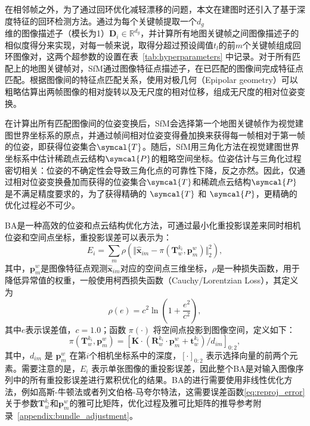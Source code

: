 在相邻帧之外，为了通过回环优化减轻漂移的问题，本文在建图时还引入了基于深度特征的回环检测方法。通过为每个关键帧提取一个$d_g$维的图像描述子（模长为1）$\symbf{D}_i \in \mathbb{R}^{d_g}$，并计算所有地图关键帧之间图像描述子的相似度得分来实现，对每一帧来说，取得分超过预设阈值$t_l$的前$m$个关键帧组成回环图像对，这两个超参数的设置在表~\ref{tab:hyperparameters} 中记录。对于所有匹配上的地图关键帧对，SfM通过图像特征点描述子，在已匹配的图像间完成特征点匹配。根据图像间的特征点匹配关系，使用对极几何（Epipolar geometry）\cite{wexler2003learning}可以粗略估算出两帧图像的相对旋转以及无尺度的相对位移，组成无尺度的相对位姿变换。

在计算出所有匹配图像间的位姿变换后，SfM会选择第一个地图关键帧作为视觉建图世界坐标系的原点，并通过帧间相对位姿变得叠加换来获得每一帧相对于第一帧的位姿，即获得位姿集合$\symcal{T}$。随后，SfM用三角化方法在视觉建图世界坐标系中估计稀疏点云结构$\symcal{P}$的粗略空间坐标。位姿估计与三角化过程密切相关：位姿的不确定性会导致三角化点的可靠性下降，反之亦然。因此，仅通过相对位姿变换叠加而获得的位姿集合$\symcal{T}$和稀疏点云结构$\symcal{P}$是不满足精度要求的，为了获得精确的 $\symcal{T}$ 和 $\symcal{P}$，更精确的优化过程必不可少。

BA是一种高效的位姿和点云结构优化方法，可通过最小化重投影误差来同时相机位姿和空间点坐标，重投影误差可以表示为：
\begin{equation}
\label{eq:reproj_error}
E_i = \sum_{m}\rho(\Vert \hat{\symbf{x}}_{im} - \pi(\symbf{T}^{k_i}_w, \symbf{p}_{m}^{w}) \Vert ^2_2),
\end{equation}
其中，$\symbf{p}_{m}^{w}$是图像特征点观测$\hat{\symbf{x}}_{im}$对应的空间点三维坐标，$\rho$是一种损失函数，用于降低异常值的权重，一般使用柯西损失函数（Cauchy/Lorentzian Loss）\cite{black1996robust}，其定义为
\begin{equation}
  \rho(e) = c^2 \ln\left(1 + \frac{e^2}{c^2}\right),
\end{equation}
其中$e$表示误差值，$c=1.0$；函数 $\pi(\cdot)$ 将空间点投影到图像空间，定义如下：
\begin{equation}
\label{eq:proj_func}
\pi(\symbf{T}^{k_i}_w, \symbf{p}_{m}^{w}) = [\symbf{K}\cdot(\symbf{R}_w^{k_i}\cdot\symbf{p}_{m}^{w}+\symbf{t}_w^{k_i})/d_{im}]_{0:2},
\end{equation}
其中，$d_{im}$ 是 $\symbf{p}_{m}^{w}$ 在第$i$个相机坐标系中的深度，$[\cdot]_{0:2}$ 表示选择向量的前两个元素。需要注意的是，$E_i$ 表示单张图像的重投影误差，因此整个BA是对输入图像序列中的所有重投影误差进行累积优化的结果。BA的进行需要使用非线性优化方法，例如高斯-牛顿法或者列文伯格-马夸尔特法\cite{levenberg1944method}，这需要误差函数\eqref{eq:reproj_error}关于参数$\symbf{T}^{k_i}_w$和$\symbf{p}_{m}^{w}$的雅可比矩阵，优化过程及雅可比矩阵的推导参考附录~\ref{appendix:bundle_adjustment}。


